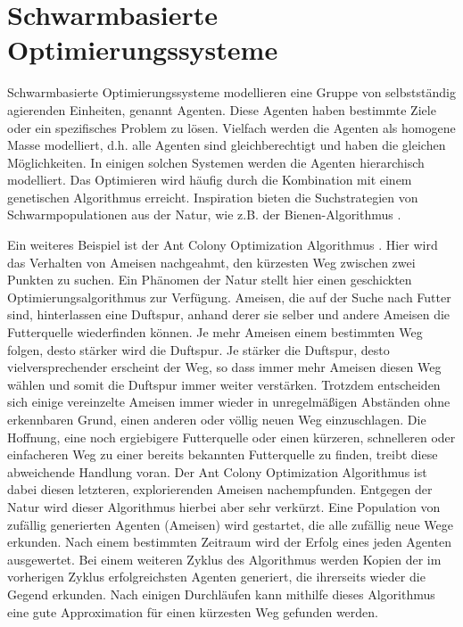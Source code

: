 \documentclass[draft=false
              ,paper=a4
              ,twoside=false
              ,fontsize=11pt
              ,headsepline
              ,BCOR10mm
              ,DIV11
              ,bibtotoc
              ,liststotoc
              ]{scrbook}
\begin{document}
\section{Schwarmbasierte Optimierungssysteme}
Schwarmbasierte Optimierungssysteme modellieren eine Gruppe von selbstständig agierenden Einheiten, genannt Agenten. Diese Agenten haben bestimmte Ziele oder ein spezifisches Problem zu lösen. Vielfach werden die Agenten als homogene Masse modelliert, d.h. alle Agenten sind gleichberechtigt und haben die gleichen Möglichkeiten. In einigen solchen Systemen werden die Agenten hierarchisch modelliert. Das Optimieren wird häufig durch die Kombination mit einem genetischen Algorithmus erreicht. Inspiration bieten die Suchstrategien von Schwarmpopulationen aus der Natur, wie z.B. der Bienen-Algorithmus \cite{citeulike:8377514}.

Ein weiteres Beispiel ist der Ant Colony Optimization Algorithmus \cite{ulster9737}. Hier wird das Verhalten von Ameisen nachgeahmt, den kürzesten Weg zwischen zwei Punkten zu suchen. Ein Phänomen der Natur stellt hier einen geschickten Optimierungsalgorithmus zur Verfügung. Ameisen, die auf der Suche nach Futter sind, hinterlassen eine Duftspur, anhand derer sie selber und andere Ameisen die Futterquelle wiederfinden können. Je mehr Ameisen einem bestimmten Weg folgen, desto stärker wird die Duftspur. Je stärker die Duftspur, desto vielversprechender erscheint der Weg, so dass immer mehr Ameisen diesen Weg wählen und somit die Duftspur immer weiter verstärken. Trotzdem entscheiden sich einige vereinzelte Ameisen immer wieder in unregelmäßigen Abständen ohne erkennbaren Grund, einen anderen oder völlig neuen Weg einzuschlagen. Die Hoffnung, eine noch ergiebigere Futterquelle oder einen kürzeren, schnelleren oder einfacheren Weg zu einer bereits bekannten Futterquelle zu finden, treibt diese abweichende Handlung voran. Der Ant Colony Optimization Algorithmus ist dabei diesen letzteren, explorierenden Ameisen nachempfunden. Entgegen der Natur wird dieser Algorithmus hierbei aber sehr verkürzt. Eine Population von zufällig generierten Agenten (Ameisen) wird gestartet, die alle zufällig neue Wege erkunden. Nach einem bestimmten Zeitraum wird der Erfolg eines jeden Agenten ausgewertet. Bei einem weiteren Zyklus des Algorithmus werden Kopien der im vorherigen Zyklus erfolgreichsten Agenten generiert, die ihrerseits wieder die Gegend erkunden. Nach einigen Durchläufen kann mithilfe dieses Algorithmus eine gute Approximation für einen kürzesten Weg gefunden werden.
\end{document}
